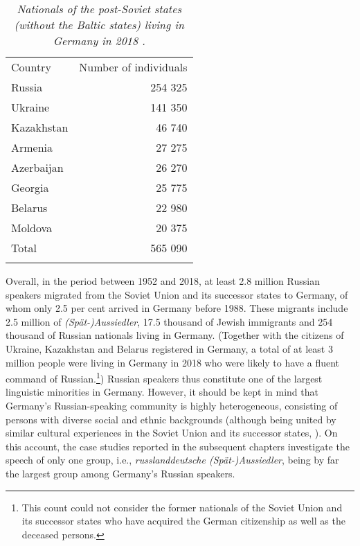 \begin{table}
\begin{small}
\begin{tabular}{l r}
	\midrule
	    \addlinespace[2mm]
			Country	&Number of individuals \\ \addlinespace[2mm]
			\midrule
			\addlinespace[2mm]
			Russia	&254 325\\
			Ukraine	&141 350\\
			Kazakhstan &46 740\\
			Armenia &27 275\\
			Azerbaijan &26 270\\
			Georgia &25 775\\
			Belarus &22 980\\
            Moldova &20 375\\
			\addlinespace[2mm]
			Total &565 090\\
			\addlinespace[2mm]
			\midrule
\end{tabular}
\end{small}
\caption{\textit{Nationals of the post-Soviet states (without the Baltic states) living in Germany in 2018 \citep[adopted from][276--278]{bamf}.}} \label{tab:3:1}
\end{table}

Overall, in the period between 1952 and 2018, at least 2.8 million Russian speakers migrated from the Soviet Union and its successor states to Germany, of whom only 2.5 per cent arrived in Germany before 1988. These migrants include 2.5 million of \textit{(Spät-)Aussiedler}, 17.5 thousand of Jewish immigrants and 254 thousand of Russian nationals living in Germany. (Together with the citizens of Ukraine, Kazakhstan and Belarus registered in Germany, a total of at least 3 million people were living in Germany in 2018 who were likely to have a fluent command of Russian.\footnote{This count could not consider the former nationals of the Soviet Union and its successor states who have acquired the German citizenship as well as the deceased persons.}) Russian speakers thus constitute one of the largest linguistic minorities in Germany. However, it should be kept in mind that Germany's Russian-speaking community is highly heterogeneous, consisting of persons with diverse social and ethnic backgrounds (although being united by similar cultural experiences in the Soviet Union and its successor states, \citealt[cf.][]{gasimov-paper, levkovych}). On this account, the case studies reported in the subsequent chapters investigate the speech of only one group, i.e., \textit{russlanddeutsche (Spät-)Aussiedler}, being by far the largest group among Germany's Russian speakers.


